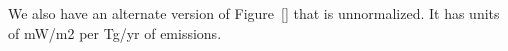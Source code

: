 We also have an alternate version of Figure~\ref{} that is unnormalized. It has units of mW/m2 per Tg/yr of emissions.